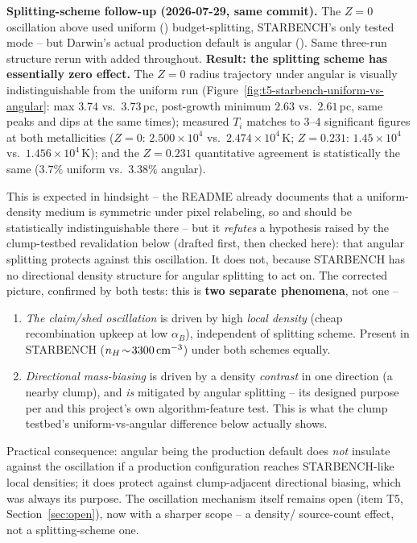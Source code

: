 \textbf{Splitting-scheme follow-up (2026-07-29, same commit).} The
$Z=0$ oscillation above used uniform () budget-splitting,
STARBENCH's only tested mode -- but Darwin's actual production default
is angular (). Same three-run structure rerun with
 added throughout. \textbf{Result: the
splitting scheme has essentially zero effect.} The $Z=0$ radius
trajectory under angular is visually indistinguishable from the
uniform run (Figure~\ref{fig:t5-starbench-uniform-vs-angular}: max
$3.74$ vs.\ $3.73\,$pc, post-growth minimum $2.63$ vs.\ $2.61\,$pc,
same peaks and dips at the same times); measured $T_i$ matches to
3--4 significant figures at both metallicities ($Z=0$:
$2.500\times10^4$ vs.\ $2.474\times10^4\,$K; $Z=0.231$:
$1.45\times10^4$ vs.\ $1.456\times10^4\,$K); and the $Z=0.231$
quantitative agreement is statistically the same
($3.7\%$ uniform vs.\ $3.38\%$ angular).

This is expected in hindsight -- the 
README already documents that a uniform-density medium is symmetric
under pixel relabeling, so  and  should be
statistically indistinguishable there -- but it \emph{refutes} a
hypothesis raised by the clump-testbed revalidation below (drafted
first, then checked here): that angular splitting protects against
this oscillation. It does not, because STARBENCH has no directional
density structure for angular splitting to act on. The corrected
picture, confirmed by both tests: this is \textbf{two separate
phenomena}, not one --
\begin{enumerate}
\item \emph{The claim/shed oscillation} is driven by high
  \emph{local density} (cheap recombination upkeep at low
  $\alpha_B$), independent of splitting scheme. Present in STARBENCH
  ($n_H\!\sim\!3300\,{\rm cm^{-3}}$) under both schemes equally.
\item \emph{Directional mass-biasing} is driven by a density
  \emph{contrast} in one direction (a nearby clump), and \emph{is}
  mitigated by angular splitting -- its designed purpose per
  \citet{Smith2021} and this project's own
   algorithm-feature test. This is what
  the clump testbed's uniform-vs-angular difference below actually
  shows.
\end{enumerate}
Practical consequence: angular being the production default does
\emph{not} insulate against the oscillation if a production
configuration reaches STARBENCH-like local densities; it does protect
against clump-adjacent directional biasing, which was always its
purpose. The oscillation mechanism itself remains open (item T5,
Section~\ref{sec:open}), now with a sharper scope -- a density/
source-count effect, not a splitting-scheme one.

